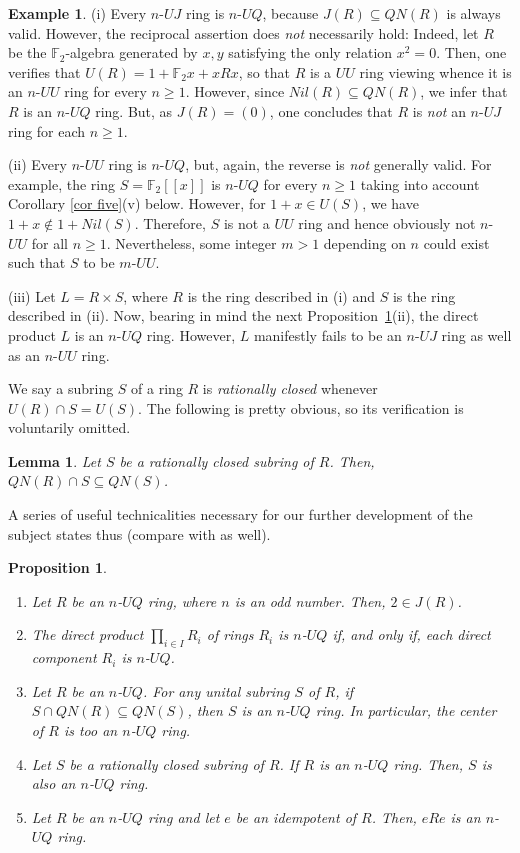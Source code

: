 \documentclass[12pt]{amsart}
\newtheorem{proposition}[theorem]{Proposition}
\newtheorem{lemma}[theorem]{Lemma}
\theoremstyle{definition}
\newtheorem{example}[theorem]{Example}
\begin{document}
\begin{example}
(i) Every $n$-$UJ$ ring is $n$-$UQ$, because $J(R) \subseteq QN(R)$ is always valid. However, the reciprocal assertion does {\it not} necessarily hold: Indeed, let $R$ be the $\mathbb F_2$-algebra generated by $x, y$ satisfying the only relation $x^2=0$. Then, one verifies that $U(R)=1+\mathbb F_2x+ xRx$, so that $R$ is a $UU$ ring viewing \cite[Example 2.5]{DL} whence it is an $n$-$UU$ ring for every $n\geq1$. However, since $Nil(R)\subseteq QN(R)$, we infer that $R$ is an $n$-$UQ$ ring. But, as $J(R)=(0)$, one concludes that $R$ is {\it not} an $n$-$UJ$ ring for each $n\geq1$.
	
(ii) Every $n$-$UU$ ring is $n$-$UQ$, but, again, the reverse is {\it not} generally valid. For example, the ring $S = \mathbb{F}_2[[x]]$ is $n$-$UQ$ for every $n\geq1$ taking into account Corollary \ref{cor five}(v) below. However, for $1 + x \in U(S)$, we have $1 + x \not\in 1 + Nil(S)$. Therefore, $S$ is not a $UU$ ring and hence obviously not $n$-$UU$ for all $n\geq1$. Nevertheless, some integer $m>1$ depending on $n$ could exist such that $S$ to be $m$-$UU$.

(iii) Let $L = R \times S$, where $R$ is the ring described in (i) and $S$ is the ring described in (ii). Now, bearing in mind the next Proposition~\ref{1.1}(ii), the direct product $L$ is an $n$-$UQ$ ring. However, $L$ manifestly fails to be an $n$-$UJ$ ring as well as an $n$-$UU$ ring.
\end{example}

We say a subring $S$ of a ring $R$ is {\it rationally closed} whenever $U(R) \cap S = U(S)$. The following is pretty obvious, so its verification is voluntarily omitted.

\begin{lemma} \label{good subring}
Let $S$ be a rationally closed subring of $R$. Then, $QN(R) \cap S \subseteq QN(S)$.
\end{lemma}

A series of useful technicalities necessary for our further development of the subject states thus (compare with \cite{Tien} as well).

\begin{proposition}\label{1.1}
\begin{enumerate}
\item
Let $R$ be an $n$-$UQ$ ring, where $n$ is an odd number. Then, $2\in J(R)$.
\item
The direct product \(\prod_{i \in I} R_i\) of rings $R_i$ is $n$-$UQ$ if, and only if, each direct component \(R_i\) is $n$-$UQ$.
\item
Let \(R\) be an $n$-$UQ$. For any unital subring \(S\) of \(R\), if \(S \cap QN(R) \subseteq QN(S)\), then \(S\) is an $n$-$UQ$ ring. In particular, the center of \(R\) is too an $n$-$UQ$ ring.
\item
Let $S$ be a rationally closed subring of $R$. If $R$ is an $n$-$UQ$ ring. Then, $S$ is also an $n$-$UQ$ ring.
\item
Let \(R\) be an $n$-$UQ$ ring and let \(e\) be an idempotent of \(R\). Then, \(eRe\) is an $n$-$UQ$ ring.
\end{enumerate}
\end{proposition}
\end{document}
